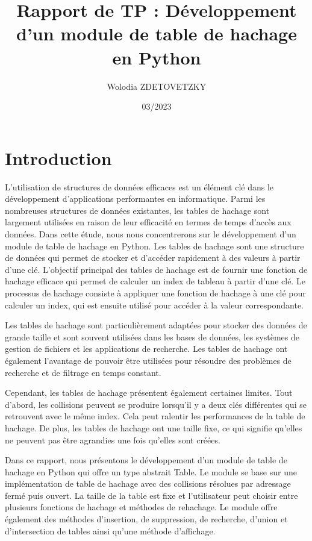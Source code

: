 \documentclass{article}
\title{Rapport de TP : Développement d'un module de table de hachage en Python}
\author{Wolodia ZDETOVETZKY}
\date{03/2023}
\begin{document}
    \maketitle
    \tableofcontents
    \newpage

    \section{Introduction}\label{sec:introduction}

    L'utilisation de structures de données efficaces est un élément clé dans le développement d'applications performantes en informatique.
    Parmi les nombreuses structures de données existantes, les tables de hachage sont largement utilisées en raison de leur efficacité en termes de temps d'accès aux données.
    Dans cette étude, nous nous concentrerons sur le développement d'un module de table de hachage en Python.
    Les tables de hachage sont une structure de données qui permet de stocker et d'accéder rapidement à des valeurs à partir d'une clé.
    L'objectif principal des tables de hachage est de fournir une fonction de hachage efficace qui permet de calculer un index de tableau à partir d'une clé.
    Le processus de hachage consiste à appliquer une fonction de hachage à une clé pour calculer un index, qui est ensuite utilisé pour accéder à la valeur correspondante.

    Les tables de hachage sont particulièrement adaptées pour stocker des données de grande taille et sont souvent utilisées dans les bases de données, les systèmes de gestion de fichiers et les applications de recherche.
    Les tables de hachage ont également l'avantage de pouvoir être utilisées pour résoudre des problèmes de recherche et de filtrage en temps constant.

    Cependant, les tables de hachage présentent également certaines limites.
    Tout d'abord, les collisions peuvent se produire lorsqu'il y a deux clés différentes qui se retrouvent avec le même index.
    Cela peut ralentir les performances de la table de hachage.
    De plus, les tables de hachage ont une taille fixe, ce qui signifie qu'elles ne peuvent pas être agrandies une fois qu'elles sont créées.

    Dans ce rapport, nous présentons le développement d'un module de table de hachage en Python qui offre un type abstrait Table.
    Le module se base sur une implémentation de table de hachage avec des collisions résolues par adressage fermé puis ouvert.
    La taille de la table est fixe et l'utilisateur peut choisir entre plusieurs fonctions de hachage et méthodes de rehachage.
    Le module offre également des méthodes d'insertion, de suppression, de recherche, d'union et d'intersection de tables ainsi qu'une méthode d'affichage.
\end{document}
